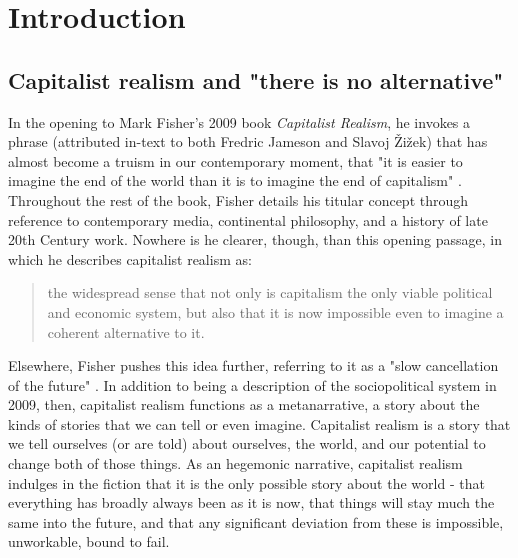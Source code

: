\chapter{Introduction}
\label{ch:1}

\section{Capitalist realism and "there is no alternative"}
\label{sec:1-1}

In the opening to Mark Fisher's 2009 book \emph{Capitalist Realism}, he invokes a phrase (attributed in-text to both Fredric Jameson and Slavoj Žižek) that has almost become a truism in our contemporary moment, that "it is easier to imagine the end of the world than it is to imagine the end of capitalism" \citep[p. 2]{fisher_capitalist_2009}. Throughout the rest of the book, Fisher details his titular concept through reference to contemporary media, continental philosophy, and a history of late 20th Century work. Nowhere is he clearer, though, than this opening passage, in which he describes capitalist realism as:
\begin{quote}
the widespread sense that not only is capitalism the only viable political and economic system, but also that it is now impossible even to imagine a coherent alternative to it. \citep[p. 2]{fisher_capitalist_2009}
\end{quote}
Elsewhere, Fisher pushes this idea further, referring to it as a "slow cancellation of the future" \citeyearpar[p. 5]{fisher_ghosts_2014}. In addition to being a description of the sociopolitical system in 2009, then, capitalist realism functions as a metanarrative, a story about the kinds of stories that we can tell or even imagine. Capitalist realism is a story that we tell ourselves (or are told) about ourselves, the world, and our potential to change both of those things. As an hegemonic narrative, capitalist realism indulges in the fiction that it is the only possible story about the world - that everything has broadly always been as it is now, that things will stay much the same into the future, and that any significant deviation from these is impossible, unworkable, bound to fail. 

